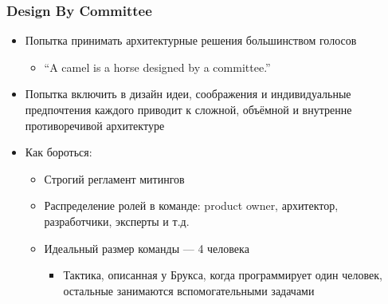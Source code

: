 \documentclass{../cscslides}
\begin{document}
    \begin{frame}
        \frametitle{Design By Committee}
        \begin{itemize}
            \item Попытка принимать архитектурные решения большинством голосов
            \begin{itemize}
                \item ``A camel is a horse designed by a committee.''
            \end{itemize}
            \item Попытка включить в дизайн идеи, соображения и индивидуальные предпочтения каждого приводит к сложной, объёмной и внутренне противоречивой архитектуре
            \item Как бороться:
            \begin{itemize}
                \item Строгий регламент митингов
                \item Распределение ролей в команде: product owner, архитектор, разработчики, эксперты и т.д.
                \item Идеальный размер команды --- 4 человека
                \begin{itemize}
                    \item Тактика, описанная у Брукса, когда программирует один человек, остальные занимаются вспомогательными задачами
                \end{itemize}
            \end{itemize}
        \end{itemize}
    \end{frame}
\end{document}
